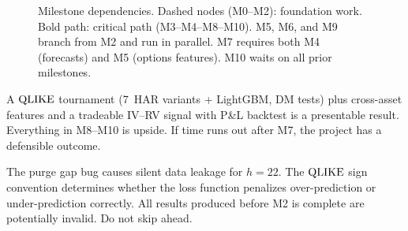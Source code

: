 \begin{figure}[htbp]
{%
}
\caption{Milestone dependencies.
Dashed nodes (M0--M2): foundation work.
Bold path: critical path (M3--M4--M8--M10).
M5, M6, and M9 branch from M2 and run in parallel.
M7 requires both M4 (forecasts) and M5 (options features).
M10 waits on all prior milestones.}
\label{fig:critical-path}
\end{figure}



\begin{keyidea}
A $\operatorname{QLIKE}$ tournament (7~HAR variants + LightGBM, DM tests) plus cross-asset features and a tradeable IV--RV signal with P\&L backtest is a presentable result.
Everything in M8--M10 is upside.
If time runs out after M7, the project has a defensible outcome.
\end{keyidea}

\begin{warning}
The purge gap bug causes silent data leakage for $h=22$.
The $\operatorname{QLIKE}$ sign convention determines whether the loss function penalizes over-prediction or under-prediction correctly.
All results produced before M2 is complete are potentially invalid.
Do not skip ahead.
\end{warning}
